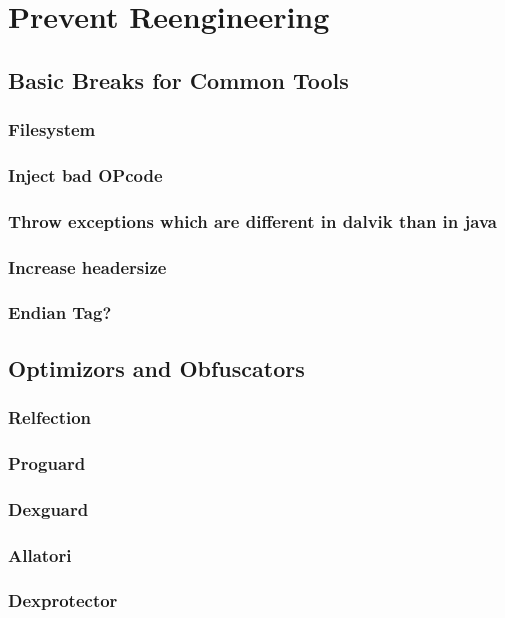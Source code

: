 \section{Prevent Reengineering}\label{section:software}
\subsection{Basic Breaks for Common Tools}
\subsubsection{Filesystem}
\subsubsection{Inject bad OPcode}
\subsubsection{Throw exceptions which are different in dalvik than in java}
\subsubsection{Increase headersize}
\subsubsection{Endian Tag?}
\subsection{Optimizors and Obfuscators}
\subsubsection{Relfection}\label{subsection:basic-}
\subsubsection{Proguard}\label{subsection:software-Proguard}
\subsubsection{Dexguard}\label{subsection:software-dexguard}
\subsubsection{Allatori}
\subsubsection{Dexprotector}\label{subsection:software-dexprotector}
